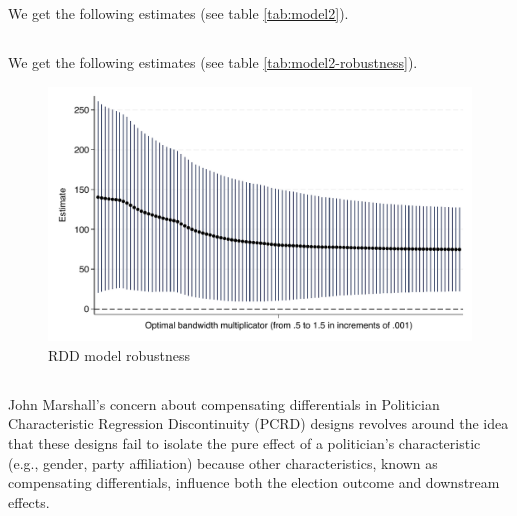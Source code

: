 \documentclass{article}
\begin{document}

\subsection{}

We get the following estimates (see table \ref{tab:model2}).




\subsection{}

We get the following estimates (see table \ref{tab:model2-robustness}).



\begin{figure}[H]
    \centering
    \includegraphics[scale=0.5]{../outputs/model2_robustness_plot.pdf}
    \caption{RDD model robustness}
    \label{fig:model2-robustness}
\end{figure}


\subsection{}

John Marshall's concern about compensating differentials in Politician Characteristic Regression Discontinuity (PCRD) designs revolves around the idea that these designs fail to isolate the pure effect of a politician's characteristic (e.g., gender, party affiliation) because other characteristics, known as compensating differentials, influence both the election outcome and downstream effects.
\end{document}
